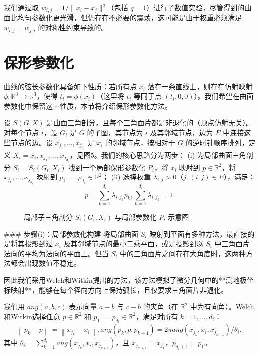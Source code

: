 \documentclass{ctexart}
\theoremstyle{proof}
\begin{document}
我们通过取 $w_{i,j}=1/\|x_i-x_j\|^q$（包括 $q=1$）进行了数值实验，尽管得到的曲面比均匀参数化更光滑，但仍存在不必要的震荡，这可能是由于权重必须满足 $w_{i,j}=w_{j,i}$ 的对称性约束导致的。

\section{保形参数化}
曲线的弦长参数化具备如下性质：若所有点 $x_i$ 落在一条直线上，则存在仿射映射 $\phi: \mathbb{R}^3 \to \mathbb{R}^3$，使得 $t_i=\phi(x_i)$（这里将 $t_i$ 等同于点 $(t_i,0,0)$）。我们希望在曲面参数化中保留这一性质，本节将介绍保形参数化方法。

设 $S(G,X)$ 是曲面三角剖分，且每个三角面片都是非退化的（顶点仿射无关）。对每个节点 $i$，设 $G_i$ 是 $G$ 的子图，其节点为 $i$ 及其邻域节点，边为 $E$ 中连接这些节点的边。设 $x_{j_1},...,x_{j_{d_i}}$ 是 $x_i$ 的邻域节点，按相对于 $G$ 的逆时针顺序排列，定义 $X_i={x_i,x_{j_1},...,x_{j_{d_i}}}$，见图5。我们的核心思路分为两步：
(i) 为局部曲面三角剖分 $S_i=S_i(G_i,X_i)$ 找到一个局部保形参数化 $P_i$，将 $x_i$ 映射到 $p \in \mathbb{R}^2$，将 $x_{j_1},...,x_{j_{d_i}}$ 映射到 $p_1,...,p_{d_i} \in \mathbb{R}^2$；
(ii) 选择权重 $\lambda_{i,j}>0$（$j:(i,j) \in E$），满足：
\[
p=\sum_{k=1}^{d_{i}} \lambda_{i, j_{k}} p_{k}, \sum_{k=1}^{d_{i}} \lambda_{i, j_{k}}=1 . \tag{11}
\]

\begin{figure}[htbp]
    \centering
    \caption{局部子三角剖分 $S_i(G_i,X_i)$ 与局部参数化 $P_i$ 示意图}
    \label{fig:5}
\end{figure}

### 步骤(i)：局部参数化构建
将局部曲面 $S_i$ 映射到平面有多种方法，最直接的是将其投影到过 $x_i$ 及其邻域节点的最小二乘平面，或是投影到以 $S_i$ 中三角面片法向的平均为法向的平面上。但当 $S_i$ 中的三角面片之间存在大角度时，这两种方法都会出现数值不稳定。

因此我们采用Welch和Witkin\cite{welch1994}提出的方法，该方法模拟了微分几何中的**测地极坐标映射**，能够在每个径向方向上保持弧长，且仅要求三角面片非退化。

我们用 $ang(a,b,c)$ 表示向量 $a-b$ 与 $c-b$ 的夹角（在 $\mathbb{R}^2$ 中为有向角）。Welch和Witkin\cite{welch1994}选择任意 $p \in \mathbb{R}^2$ 和 $p_1,...,p_{d_i} \in \mathbb{R}^2$，满足对所有 $k=1,...,d_i$：
\[
\left\| p_{k}-p\right\| =\left\| x_{j_{k}}-x_{i}\right\| , ang\left(p_{k}, p, p_{k+1}\right)=2 \pi ang\left(x_{j_{k}}, x_{i}, x_{j_{k+1}}\right) / \theta_{i}, \tag{12}
\]
其中 $\theta_{i}=\sum_{k=1}^{d_{i}} ang(x_{j_{k}}, x_{i}, x_{j_{k+1}})$，且 $x_{j_{d_i+1}}=x_{j_1}$，$p_{d_i+1}=p_1$。
\end{document}
